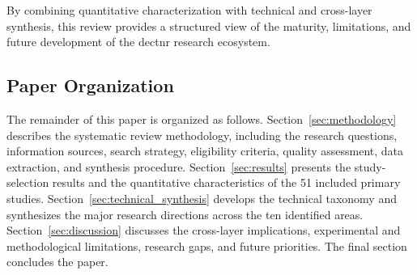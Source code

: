 By combining quantitative characterization with technical and cross-layer synthesis, this review provides a structured view of the maturity, limitations, and future development of the \gls{dectnr} research ecosystem.

\subsection{Paper Organization}
\label{subsec:paper_organization}

The remainder of this paper is organized as follows. Section~\ref{sec:methodology} describes the systematic review methodology, including the research questions, information sources, search strategy, eligibility criteria, quality assessment, data extraction, and synthesis procedure. Section~\ref{sec:results} presents the study-selection results and the quantitative characteristics of the 51 included primary studies. Section~\ref{sec:technical_synthesis} develops the technical taxonomy and synthesizes the major research directions across the ten identified areas. Section~\ref{sec:discussion} discusses the cross-layer implications, experimental and methodological limitations, research gaps, and future priorities. The final section concludes the paper.